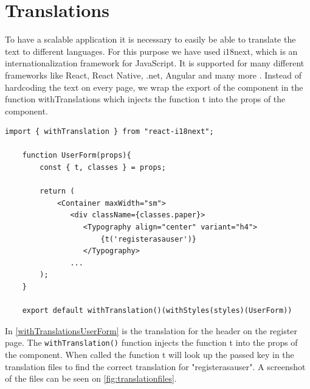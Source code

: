 \section{Translations}
To have a scalable application it is necessary to easily be able to translate the text to different languages.
For this purpose we have used i18next, which is an internationalization framework for JavaScript.
It is supported for many different frameworks like React, React Native, .net, Angular and many more \cite{react-i18next}.
Instead of hardcoding the text on every page, we wrap the export of the component in the function withTranslations which injects the function t into the props of the component.  

\begin{lstlisting}[caption={Translated header when registering as a user.}, captionpos=b, label={withTranslationsUserForm}]
    import { withTranslation } from "react-i18next";

    function UserForm(props){
        const { t, classes } = props;

        return (
            <Container maxWidth="sm">
               <div className={classes.paper}>
                  <Typography align="center" variant="h4">
                      {t('registerasauser')}
                  </Typography>
               ...
        );
    }

    export default withTranslation()(withStyles(styles)(UserForm))
\end{lstlisting}
\noindent
In \autoref{withTranslationsUserForm} is the translation for the header on the register page.
The \texttt{withTranslation()} function injects the function t into the props of the component. When called the function t will look up the passed key in the translation files to find the correct translation for "registerasauser". 
A screenshot of the files can be seen on \autoref{fig:translationfiles}.
